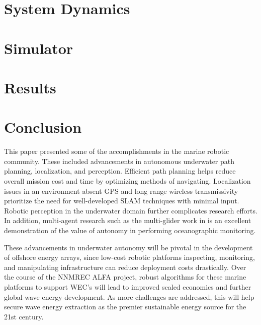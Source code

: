 \documentclass[conference]{IEEEtran}
\begin{document}
\section{System Dynamics} \label{sec:dynamics}

\section{Simulator} \label{sec:sim}

\section{Results} \label{sec:results}

\section{Conclusion} \label{sec:conclusion}
This paper presented some of the accomplishments in the marine robotic community. These included advancements in autonomous underwater path planning, localization, and perception. Efficient path planning helps reduce overall mission cost and time by optimizing methods of navigating. Localization issues in an environment absent GPS and long range wireless transmissivity prioritize the need for well-developed SLAM techniques with minimal input. Robotic perception in the underwater domain further complicates research efforts. In addition, multi-agent research such as the multi-glider work in \cite{leonard} is an excellent demonstration of the value of autonomy in performing oceanographic monitoring.

These advancements in underwater autonomy will be pivotal in the development of offshore energy arrays, since low-cost robotic platforms inspecting, monitoring, and manipulating infrastructure can reduce deployment costs drastically. Over the course of the NNMREC ALFA project, robust algorithms for these marine platforms to support WEC's will lead to improved scaled economics and further global wave energy development. As more challenges are addressed, this will help secure wave energy extraction as the premier sustainable energy source for the 21st century.



\end{document}
